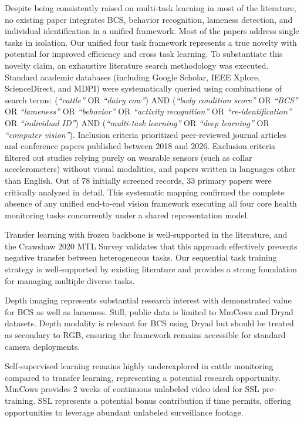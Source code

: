 Despite being consistently raised on multi-task learning in most of the literature, no existing paper integrates BCS, behavior recognition, lameness detection, and individual identification in a unified framework. Most of the papers address single tasks in isolation. Our unified four task framework represents a true novelty with potential for improved efficiency and cross task learning. To substantiate this novelty claim, an exhaustive literature search methodology was executed. Standard academic databases (including Google Scholar, IEEE Xplore, ScienceDirect, and MDPI) were systematically queried using combinations of search terms: (\textit{``cattle''} OR \textit{``dairy cow''}) AND (\textit{``body condition score''} OR \textit{``BCS''} OR \textit{``lameness''} OR \textit{``behavior''} OR \textit{``activity recognition''} OR \textit{``re-identification''} OR \textit{``individual ID''}) AND (\textit{``multi-task learning''} OR \textit{``deep learning''} OR \textit{``computer vision''}). Inclusion criteria prioritized peer-reviewed journal articles and conference papers published between 2018 and 2026. Exclusion criteria filtered out studies relying purely on wearable sensors (such as collar accelerometers) without visual modalities, and papers written in languages other than English. Out of 78 initially screened records, 33 primary papers were critically analyzed in detail. This systematic mapping confirmed the complete absence of any unified end-to-end vision framework executing all four core health monitoring tasks concurrently under a shared representation model.

Transfer learning with frozen backbone is well-supported in the literature, and the Crawshaw 2020 MTL Survey validates that this approach effectively prevents negative transfer between heterogeneous tasks. Our sequential task training strategy is well-supported by existing literature and provides a strong foundation for managing multiple diverse tasks.

Depth imaging represents substantial research interest with demonstrated value for BCS as well as lameness. Still, public data is limited to MmCows and Dryad datasets. Depth modality is relevant for BCS using Dryad but should be treated as secondary to RGB, ensuring the framework remains accessible for standard camera deployments.

Self-supervised learning remains highly underexplored in cattle monitoring compared to transfer learning, representing a potential research opportunity. MmCows provides 2 weeks of continuous unlabeled video ideal for SSL pre-training. SSL represents a potential bonus contribution if time permits, offering opportunities to leverage abundant unlabeled surveillance footage.

